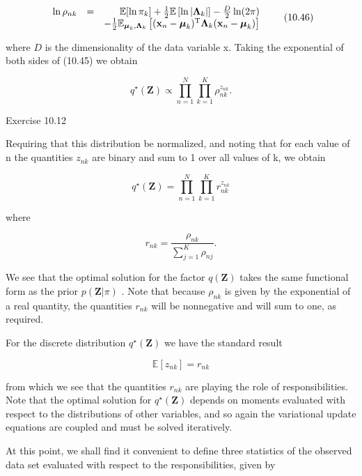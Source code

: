 \documentclass[
  10
]{article}
\begin{document}
\[
\begin{array}{r l r} \ln \rho_ {n k} & = & \mathbb {E} [ \ln \pi_ {k} ] + \frac {1}{2} \mathbb {E} \left[ \ln | \boldsymbol {\Lambda} _ {k} | \right] - \frac {D}{2} \ln (2 \pi) \\ & & - \frac {1}{2} \mathbb {E} _ {\boldsymbol {\mu} _ {k}, \boldsymbol {\Lambda} _ {k}} \left[ (\mathbf {x} _ {n} - \boldsymbol {\mu} _ {k}) ^ {\mathrm{T}} \boldsymbol {\Lambda} _ {k} (\mathbf {x} _ {n} - \boldsymbol {\mu} _ {k}) \right] \end{array}\tag{10.46}
\]

where \(D\) is the dimensionality of the data variable x. Taking the
exponential of both sides of (10.45) we obtain

\[
q ^ {\star} (\mathbf {Z}) \propto \prod_ {n = 1} ^ {N} \prod_ {k = 1} ^ {K} \rho_ {n k} ^ {z _ {n k}}.\tag{10.47}
\]

Exercise 10.12

Requiring that this distribution be normalized, and noting that for each
value of n the quantities \(z _ { n k }\) are binary and sum to 1 over
all values of k, we obtain

\[
q ^ {\star} (\mathbf {Z}) = \prod_ {n = 1} ^ {N} \prod_ {k = 1} ^ {K} r _ {n k} ^ {z _ {n k}}\tag{10.48}
\]

where

\[
r _ {n k} = \frac {\rho_ {n k}}{\sum_ {j = 1} ^ {K} \rho_ {n j}}.\tag{10.49}
\]

We see that the optimal solution for the factor \(q ( \mathbf { Z } )\)
takes the same functional form as the prior
\(p ( \mathbf { Z } | \pi )\) . Note that because \(\rho _ { n k }\) is
given by the exponential of a real quantity, the quantities
\(r _ { n k }\) will be nonnegative and will sum to one, as required.

For the discrete distribution \(q ^ { \star } ( \mathbf { Z } )\) we
have the standard result

\[
\mathbb {E} [ z _ {n k} ] = r _ {n k}\tag{10.50}
\]

from which we see that the quantities \(r _ { n k }\) are playing the
role of responsibilities. Note that the optimal solution for
\(q ^ { \star } ( \mathbf { Z } )\) depends on moments evaluated with
respect to the distributions of other variables, and so again the
variational update equations are coupled and must be solved iteratively.

At this point, we shall find it convenient to define three statistics of
the observed data set evaluated with respect to the responsibilities,
given by
\end{document}
